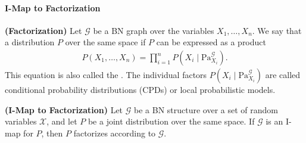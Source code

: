 \documentclass{article}
\newcommand{\bfs}[1]{\textbf{({#1}) }}
\begin{document}
\paragraph{I-Map to Factorization}
\begin{defa}\bfs{Factorization}
Let $\mathcal{G}$ be a BN graph over the variables $X_{1}, \ldots, X_{n}$. We say that a distribution $P$ over the same space  if $P$ can be expressed as a product
\begin{align*}
P\left(X_{1}, \ldots, X_{n}\right)=\prod_{i=1}^{n} P\left(X_{i} \mid \mathrm{Pa}_{X_{i}}^{\mathcal{G}}\right) .
\end{align*}
This equation is also called the . The individual factors $P\left(X_{i} \mid \mathrm{Pa}_{X_{i}}^{\mathcal{G}}\right)$ are called conditional probability distributions (CPDs) or local probabilistic models.
\end{defa}

\begin{thma}\bfs{I-Map to Factorization}\label{thm:imap2frac}
Let $\mathcal{G}$ { be a } BN structure over a set of random variables $\mathcal{X}$, and let $P$ { be a joint distribution over } the same space. If $\mathcal{G}$ is an I-map for $P$, then $P$ factorizes according to $\mathcal{G}$.
\end{thma}
\end{document}
